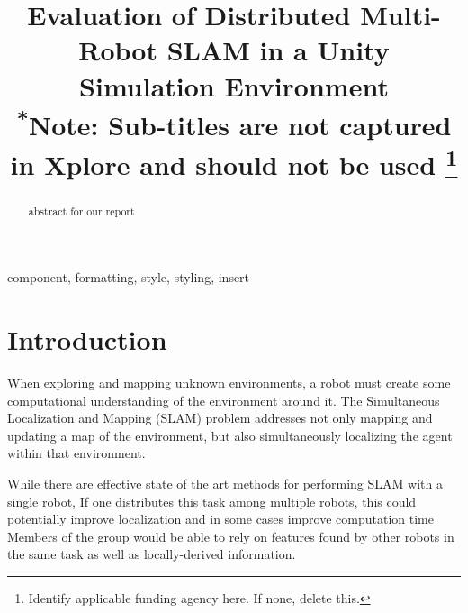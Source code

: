 \documentclass[11pt, conference]{IEEEtran}
\begin{document}
\title{Evaluation of Distributed Multi-Robot SLAM in a Unity Simulation Environment\\
{\footnotesize \textsuperscript{*}Note: Sub-titles are not captured in Xplore and
should not be used}
\thanks{Identify applicable funding agency here. If none, delete this.}
}

\author{
\and
{}
}

\maketitle

\begin{abstract}
abstract for our report
\end{abstract}

\begin{IEEEkeywords}
component, formatting, style, styling, insert
\end{IEEEkeywords}


\section{Introduction}
When exploring and mapping unknown environments, a robot must create some computational understanding of the environment around it. The Simultaneous Localization and Mapping (SLAM) problem addresses not only mapping and updating a map of the environment, but also simultaneously localizing the agent within that environment.

While there are effective state of the art methods for performing SLAM with a single robot, If one distributes this task among multiple robots, this could potentially improve localization \cite{1067998} and in some cases improve computation time \cite{Bonin} Members of the group would be able to rely on features found by other robots in the same task as well as locally-derived information.
\end{document}
